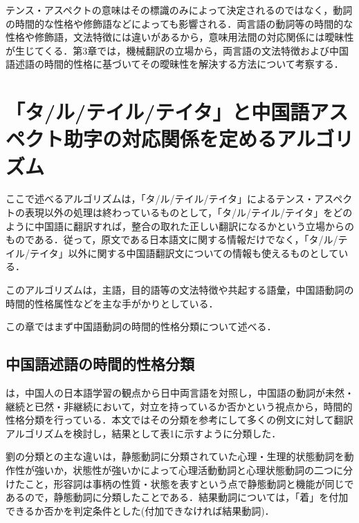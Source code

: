 テンス・アスペクトの意味はその標識のみによって決定されるのではなく，動詞の時間的な性格や修飾語などによっても影響される．両言語の動詞等の時間的な性格や修飾語，文法特徴には違いがあるから，意味用法間の対応関係には曖昧性が生じてくる．第3章では，機械翻訳の立場から，両言語の文法特徴および中国語述語の時間的性格に基づいてその曖昧性を解決する方法について考察する．


\section{「タ/ル/テイル/テイタ」と中国語アスペクト助字の対応関係を定めるアルゴリズム}

ここで述べるアルゴリズムは，「タ/ル/テイル/テイタ」によるテンス・アスペクトの表現以外の処理は終わっているものとして，「タ/ル/テイル/テイタ」をどのように中国語に翻訳すれば，整合の取れた正しい翻訳になるかという立場からのものである．従って，原文である日本語文に関する情報だけでなく，「タ/ル/テイル/テイタ」以外に関する中国語翻訳文についての情報も使えるものとしている．

このアルゴリズムは，主語，目的語等の文法特徴や共起する語彙，中国語動詞の時間的性格属性などを主な手がかりとしている．

この章ではまず中国語動詞の時間的性格分類について述べる．


\subsection{中国語述語の時間的性格分類}

\cite{Ryu2000}は，中国人の日本語学習の観点から日中両言語を対照し，中国語の動詞が未然・継続と已然・非継続において，対立を持っているか否かという視点から，時間的性格分類を行っている．本文ではその分類を参考にして多くの例文に対して翻訳アルゴリズムを検討し，結果として表1に示すように分類した．

劉の分類との主な違いは，静態動詞に分類されていた心理・生理的状態動詞を動作性が強いか，状態性が強いかによって心理活動動詞と心理状態動詞の二つに分けたこと，形容詞は事柄の性質・状態を表すという点で静態動詞と機能が同じであるので，静態動詞に分類したことである．結果動詞については，「着」を付加できるか否かを判定条件とした(付加できなければ結果動詞)．

